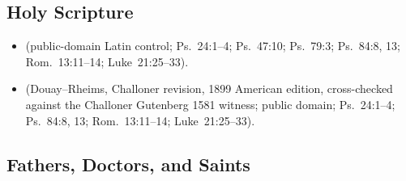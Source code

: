 \subsection*{Holy Scripture}
\begin{itemize}
\item {} (public-domain Latin control; Ps.~24:1--4; Ps.~47:10; Ps.~79:3; Ps.~84:8, 13; Rom.~13:11--14; Luke~21:25--33).
\item {} (Douay--Rheims, Challoner revision, 1899 American edition, cross-checked against the Challoner Gutenberg 1581 witness; public domain; Ps.~24:1--4; Ps.~84:8, 13; Rom.~13:11--14; Luke~21:25--33).
\end{itemize}

\subsection*{Fathers, Doctors, and Saints}
